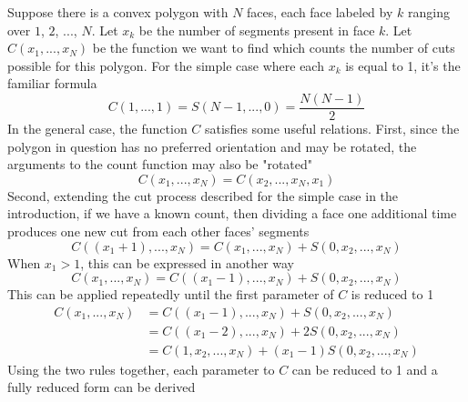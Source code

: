 \documentclass[12pt]{article}
\begin{document}
Suppose there is a convex polygon with $N$ faces, each face labeled by $k$ ranging over
$1$, $2$, $...$, $N$. Let $x_k$ be the number of segments present in face $k$.
Let $C(x_1,...,x_N)$ be the function we want to find which counts the number of cuts possible for this polygon. For the simple case where each $x_k$ is equal to 1, it's the familiar
formula
\begin{equation}
    C(1,...,1) = S(N-1,...,0) = \frac{N (N - 1)}{2}
\end{equation}
In the general case, the function $C$ satisfies some useful relations. First,
since the polygon in question has no preferred orientation and may be rotated, the
arguments to the count function may also be "rotated"
\begin{equation}
    C(x_1,...,x_N) = C(x_2,...,x_N,x_1)
\end{equation}
Second, extending the cut process described for the simple case in the introduction, if we have a known count, then dividing a face one additional time produces one new cut from each other faces' segments
\begin{equation}
    C((x_1 + 1),...,x_N) = C(x_1,...,x_N) + S(0,x_2,...,x_N)
\end{equation}
When $x_1 > 1$, this can be expressed in another way
\begin{equation}
    C(x_1,...,x_N) = C((x_1 - 1),...,x_N) + S(0,x_2,...,x_N)
\end{equation}
This can be applied repeatedly until the first parameter of $C$ is
reduced to 1
\begin{equation}
\begin{aligned}
    C(x_1,...,x_N) &= C((x_1 - 1),...,x_N) +           S(0,x_2,...,x_N) \\
                   &= C((x_1 - 2),...,x_N) +         2 S(0,x_2,...,x_N) \\
                   &= C(1,x_2,...,x_N)     + (x_1 - 1) S(0,x_2,...,x_N)
\end{aligned}
\end{equation}
Using the two rules together, each parameter to $C$ can be reduced to 1
and a fully reduced form can be derived
\end{document}
